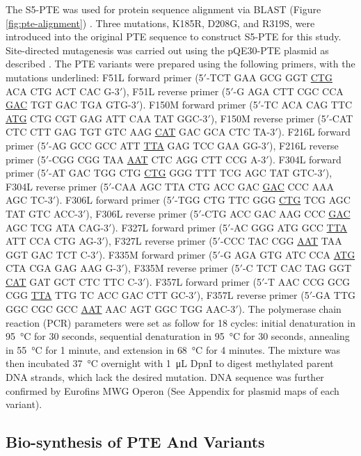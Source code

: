 \begin{refsection}
The S5-PTE \cite{Griffiths2003} was used for protein sequence alignment via
BLAST (Figure \ref{fig:pte-alignment}) \cite{Altschul1990a}. Three mutations,
K185R, D208G, and R319S, were introduced into the original PTE sequence to
construct S5-PTE for this study. Site-directed mutagenesis was carried out
using the pQE30-PTE plasmid as described \cite{Yang2014a,Baker2011b}. The PTE
variants were prepared using the following primers, with the mutations
underlined: F51L forward primer (5$'$-TCT GAA GCG GGT \underline{CTG} ACA CTG
ACT CAC G-3$'$), F51L reverse primer (5$'$-G AGA CTT CGC CCA \underline{GAC}
TGT GAC TGA GTG-3$'$).  F150M forward primer (5$'$-TC ACA CAG TTC
\underline{ATG} CTG CGT GAG ATT CAA TAT GGC-3$'$),  F150M reverse primer
(5$'$-CAT CTC CTT GAG TGT GTC AAG \underline{CAT} GAC GCA CTC TA-3$'$). F216L
forward primer (5$'$-AG GCC GCC ATT \underline{TTA} GAG TCC GAA GG-3$'$), F216L
reverse primer (5$'$-CGG CGG TAA \underline{AAT} CTC AGG CTT CCG A-3$'$).
F304L forward primer (5$'$-AT GAC TGG CTG \underline{CTG} GGG TTT TCG AGC TAT
GTC-3$'$), F304L reverse primer (5$'$-CAA AGC TTA CTG ACC GAC \underline{GAC}
CCC AAA AGC TC-3$'$). F306L forward primer (5$'$-TGG CTG TTC GGG
\underline{CTG} TCG AGC TAT GTC ACC-3$'$), F306L reverse primer (5$'$-CTG ACC
GAC AAG CCC \underline{GAC} AGC TCG ATA CAG-3$'$). F327L forward primer
(5$'$-AC GGG ATG GCC \underline{TTA} ATT CCA CTG AG-3$'$), F327L reverse primer
(5$'$-CCC TAC CGG \underline{AAT} TAA GGT GAC TCT C-3$'$).  F335M forward
primer (5$'$-G AGA GTG ATC CCA \underline{ATG} CTA CGA GAG AAG G-3$'$), F335M
reverse primer (5$'$-C TCT CAC TAG GGT \underline{CAT} GAT GCT CTC TTC C-3$'$).
F357L forward primer (5$'$-T AAC CCG GCG CGG \underline{TTA} TTG TC ACC GAC CTT
GC-3$'$), F357L reverse primer (5$'$-GA TTG GGC CGC GCC \underline{AAT} AAC AGT
GGC TGG AAC-3$'$). The polymerase chain reaction (PCR) parameters were set as
follow for 18 cycles: initial denaturation in \SI{95}{\celsius} for 30 seconds,
sequential denaturation in \SI{95}{\celsius} for 30 seconds, annealing in
\SI{55}{\celsius} for 1 minute, and extension in \SI{68}{\celsius} for 4
minutes. The mixture was then incubated \SI{37}{\celsius} overnight with
\SI{1}{\micro\L} DpnI to digest methylated parent DNA strands, which lack the
desired mutation. DNA sequence was further confirmed by Eurofins MWG Operon
(See Appendix for plasmid maps of each variant).

\subsection{Bio-synthesis of PTE And Variants}


\end{refsection}
